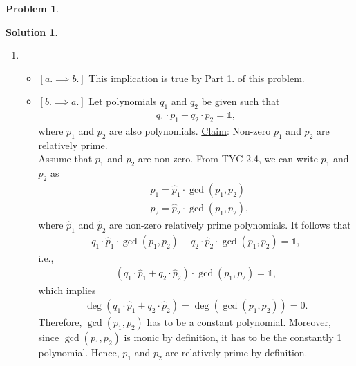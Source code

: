 \documentclass{article}
\theoremstyle{definition}
\newtheorem*{prob*}{Problem}
\newtheorem*{sln*}{Solution}
\begin{document}
\begin{prob*}
\begin{sln*}
\begin{enumerate}
	
	\item 
	\begin{itemize}
		\item $[a. \implies b.]$ This implication is true by Part 1. of this problem.
		\item $[b. \implies a.]$ Let polynomials $q_1$ and $q_2$ be given such that
		\begin{align*}
		q_1 \cdot p_1 + q_2 \cdot p_2 = \mathbb{1},
		\end{align*} 
		where $p_1$ and $p_2$ are also polynomials. \underline{Claim}: Non-zero $p_1$ and $p_2$ are relatively prime. \\
		
		Assume that $p_1$ and $p_2$ are non-zero. From TYC 2.4, we can write $p_1$ and $p_2$ as
		\begin{align*}
		&p_1 = \hat{p}_1 \cdot \gcd(p_1, p_2)\\
		&p_2 = \hat{p}_2 \cdot \gcd(p_1, p_2),
		\end{align*}
		where $\hat{p}_1$ and $\hat{p}_2$ are non-zero relatively prime polynomials. It follows that
		\begin{align*}
		q_1 \cdot \hat{p}_1 \cdot \gcd(p_1, p_2)  + q_2 \cdot \hat{p}_2 \cdot \gcd(p_1, p_2) = \mathbb{1},
		\end{align*}
		i.e.,
		\begin{align*}
		(q_1 \cdot \hat{p}_1 + q_2 \cdot \hat{p}_2 )\cdot \gcd(p_1, p_2) = \mathbb{1},
		\end{align*}
		which implies
		\begin{align*}
		\deg(q_1 \cdot \hat{p}_1 + q_2 \cdot \hat{p}_2) = \deg(\gcd(p_1,p_2)) = 0.
		\end{align*}
		Therefore, $\gcd(p_1, p_2)$ has to be a constant polynomial. Moreover, since $\gcd(p_1, p_2)$ is monic by definition, it has to be the constantly 1 polynomial. Hence, $p_1$ and $p_2$ are relatively prime by definition. 
	\end{itemize}



\end{enumerate}
\end{sln*}
\end{prob*}
\end{document}
